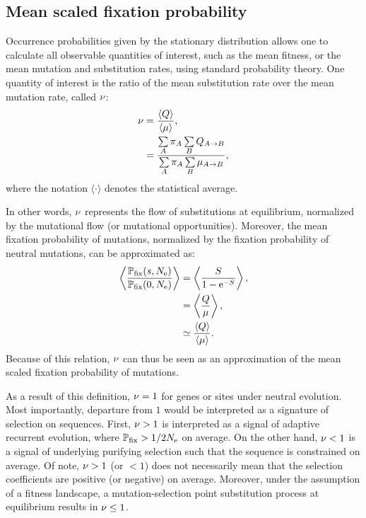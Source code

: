 \subsection{Mean scaled fixation probability}
\label{subsec:mean-scaled-fixation-probability}

Occurrence probabilities given by the stationary distribution allows one to calculate all observable quantities of interest, such as the mean fitness, or the mean mutation and substitution rates, using standard probability theory.
One quantity of interest is the ratio of the mean substitution rate over the mean mutation rate, called $ \nu $:
\begin{align}
    \nu & = \dfrac{ \langle Q \rangle }{\langle \mu \rangle},
    \label{eq:relative-sub-rate} \\
    & = \dfrac{ \sum\limits_{A} \pi_{A} \sum\limits_{B} Q_{A \to B}}{\sum\limits_{A} \pi_{A}  \sum\limits_{B} \mu_{A \to B}},
\end{align}
where the notation $\langle \cdot \rangle$ denotes the statistical average.

In other words, $ \nu $ represents the flow of substitutions at equilibrium, normalized by the mutational flow (or mutational opportunities).
Moreover, the mean fixation probability of mutations, normalized by the fixation probability of neutral mutations, can be approximated as:
\begin{align}
    \left\langle  \dfrac{ \mathbb{P}_{\text{fix}} (s, N_{\text{e}} ) }{\mathbb{P}_{\text{fix}} (0, N_{\text{e}} )}  \right\rangle & = \left\langle  \dfrac{ S }{1 - \text{e}^{- S}} \right\rangle, \\
    & = \left\langle \dfrac{ Q }{\mu} \right\rangle, \\
    & \simeq \dfrac{ \langle Q \rangle }{\langle \mu \rangle}.
\end{align}
Because of this relation, $\nu$ can thus be seen as an approximation of the mean scaled fixation probability of mutations.

As a result of this definition, $\nu=1$ for genes or sites under neutral evolution.
Most importantly, departure from $1$ would be interpreted as a signature of selection on sequences.
First, $\nu>1$ is interpreted as a signal of adaptive recurrent evolution, where $\mathbb{P}_{\text{fix}} > 1/2 N_{\text{e}}$ on average.
On the other hand, $\nu<1$ is a signal of underlying purifying selection such that the sequence is constrained on average.
Of note, $ \nu > 1$ (or $ < 1$) does not necessarily mean that the selection coefficients are positive (or negative) on average.
Moreover, under the assumption of a fitness landscape, a mutation-selection point substitution process at equilibrium results in $\nu \leq 1$.


